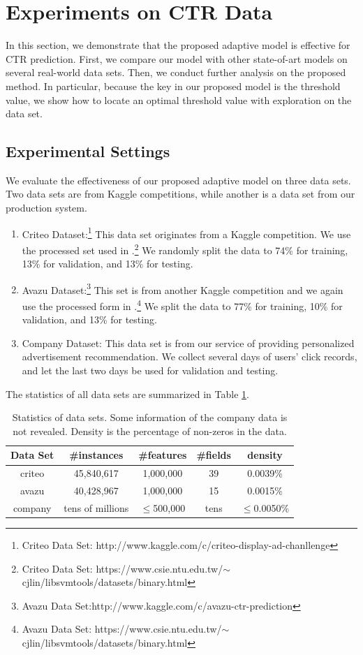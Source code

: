 \section{Experiments on CTR Data}
In this section, we demonstrate that the proposed adaptive model is effective for CTR prediction. First, we compare our model with other state-of-art models on several real-world data sets. Then, we conduct further analysis on the proposed method. In particular, because the key in our proposed model is the threshold value, we show how to locate an optimal threshold value with exploration on the data set.

\subsection{Experimental Settings}
We evaluate the effectiveness of our proposed adaptive model on three data sets. Two data sets are from Kaggle competitions, while another is a data set from our production system.
\begin{enumerate}
\item Criteo Dataset:\footnote{Criteo Data Set: http://www.kaggle.com/c/criteo-display-ad-chanllenge} This data set originates from a Kaggle competition. We use the processed set used in \cite{Juan:2016:FFM:2959100.2959134}.\footnote{Criteo Data Set: https://www.csie.ntu.edu.tw/$\sim$cjlin/libsvmtools/datasets/binary.html} We randomly split the data to 74\% for training, 13\% for validation, and 13\% for testing.
\item Avazu Dataset:\footnote{Avazu Data Set:http://www.kaggle.com/c/avazu-ctr-prediction} This set is from another Kaggle competition and we again use the processed form in \cite{Juan:2016:FFM:2959100.2959134}.\footnote{Avazu Data Set: https://www.csie.ntu.edu.tw/$\sim$cjlin/libsvmtools/datasets/binary.html} We split the data to 77\% for training, 10\% for validation, and 13\% for testing.
\item Company Dataset: This data set is from our service of providing personalized advertisement recommendation. We collect several days of users' click records, and let the last two days be used for validation and testing.
\end{enumerate}

The statistics of all data sets are summarized in Table \ref{tab1}.

\begin{table}[ht]
\caption{Statistics of data sets. Some information of the company data is not revealed. Density is the percentage of non-zeros in the data.}
\label{tab1}
\centering
\begin{tabular}{|c|c|c|c|c|}
   \hline
  Data Set & \#instances & \#features & \#fields & density \\
  \hline
  criteo & 45,840,617 & 1,000,000 & 39 & 0.0039\%  \\
  \hline
  avazu & 40,428,967 & 1,000,000 & 15 & 0.0015\%  \\
  \hline
  company &tens of millions & $\le$500,000   &tens & $\leq$0.0050\% \\
  \hline
\end{tabular}
\end{table}

